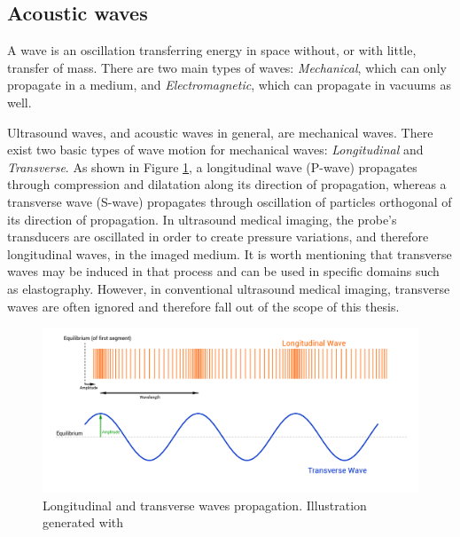 \subsection{Acoustic waves}
\label{sec:physics_waves}
A wave is an oscillation transferring energy in space without, or with little, transfer of mass. There are two main types of waves: \textit{Mechanical}, which can only propagate in a medium, and \textit{Electromagnetic}, which can propagate in vacuums as well.
\par
Ultrasound waves, and acoustic waves in general, are mechanical waves.
There exist two basic types of wave motion for mechanical waves: \textit{Longitudinal} and \textit{Transverse}. As shown in Figure \ref{fig:wave_types}, a longitudinal wave (P-wave) propagates through compression and dilatation along its direction of propagation, whereas a transverse wave (S-wave) propagates through oscillation of particles orthogonal of its direction of propagation.
In ultrasound medical imaging, the probe's transducers are oscillated in order to create pressure variations, and therefore longitudinal waves, in the imaged medium.
It is worth mentioning that transverse waves may be induced in that process and can be used in specific domains such as elastography.
However, in conventional ultrasound medical imaging, transverse waves are often ignored and therefore fall out of the scope of this thesis.

\begin{figure}[ht]
    \includegraphics[width=\linewidth]{./images/background/wave_propagation.png}
	\caption{Longitudinal and transverse waves propagation. Illustration generated with \cite{wave_propagation}}
	\label{fig:wave_types}
\end{figure}


